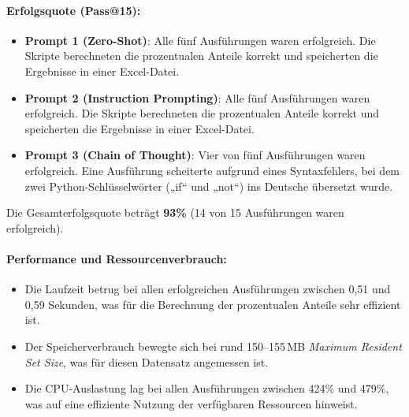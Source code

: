 \documentclass[11pt,a4paper]{article}
\begin{document}
\paragraph{Erfolgsquote (Pass@15):}
\begin{itemize}
    \item \textbf{Prompt 1 (Zero-Shot)}: Alle fünf Ausführungen waren erfolgreich. Die Skripte berechneten die prozentualen Anteile korrekt und speicherten die Ergebnisse in einer Excel-Datei.
    \item \textbf{Prompt 2 (Instruction Prompting)}: Alle fünf Ausführungen waren erfolgreich. Die Skripte berechneten die prozentualen Anteile korrekt und speicherten die Ergebnisse in einer Excel-Datei.
    \item \textbf{Prompt 3 (Chain of Thought)}: Vier von fünf Ausführungen waren erfolgreich. Eine Ausführung scheiterte aufgrund eines Syntaxfehlers, bei dem zwei Python-Schlüsselwörter („if“ und „not“) ins Deutsche übersetzt wurde.
\end{itemize}
Die Gesamterfolgsquote beträgt \textbf{93\%} (14 von 15 Ausführungen waren erfolgreich).
\begin{table}[h]
    \centering
    \caption{Ergebnisse von Testfall 3}
    \label{tab:auswertung_testfall3}
\end{table}

\paragraph{Performance und Ressourcenverbrauch:}
\begin{itemize}
    \item Die Laufzeit betrug bei allen erfolgreichen Ausführungen zwischen 0,51 und 0,59 Sekunden, was für die Berechnung der prozentualen Anteile sehr effizient ist.
    \item Der Speicherverbrauch bewegte sich bei rund 150--155\,MB \emph{Maximum Resident Set Size}, was für diesen Datensatz angemessen ist.
    \item Die CPU-Auslastung lag bei allen Ausführungen zwischen 424\% und 479\%, was auf eine effiziente Nutzung der verfügbaren Ressourcen hinweist.
\end{itemize}
\end{document}
